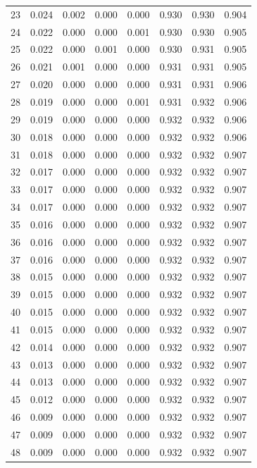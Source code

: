 \documentclass{article}%
\begin{document}
\begin{table}[H]
\begin{tabular}{cccccccc}
23 & 0.024 & 0.002 & 0.000 & 0.000 & 0.930 & 0.930 & 0.904 \\
24 & 0.022 & 0.000 & 0.000 & 0.001 & 0.930 & 0.930 & 0.905 \\
25 & 0.022 & 0.000 & 0.001 & 0.000 & 0.930 & 0.931 & 0.905 \\
26 & 0.021 & 0.001 & 0.000 & 0.000 & 0.931 & 0.931 & 0.905 \\
27 & 0.020 & 0.000 & 0.000 & 0.000 & 0.931 & 0.931 & 0.906 \\
28 & 0.019 & 0.000 & 0.000 & 0.001 & 0.931 & 0.932 & 0.906 \\
29 & 0.019 & 0.000 & 0.000 & 0.000 & 0.932 & 0.932 & 0.906 \\
30 & 0.018 & 0.000 & 0.000 & 0.000 & 0.932 & 0.932 & 0.906 \\
31 & 0.018 & 0.000 & 0.000 & 0.000 & 0.932 & 0.932 & 0.907 \\
32 & 0.017 & 0.000 & 0.000 & 0.000 & 0.932 & 0.932 & 0.907 \\
33 & 0.017 & 0.000 & 0.000 & 0.000 & 0.932 & 0.932 & 0.907 \\
34 & 0.017 & 0.000 & 0.000 & 0.000 & 0.932 & 0.932 & 0.907 \\
35 & 0.016 & 0.000 & 0.000 & 0.000 & 0.932 & 0.932 & 0.907 \\
36 & 0.016 & 0.000 & 0.000 & 0.000 & 0.932 & 0.932 & 0.907 \\
37 & 0.016 & 0.000 & 0.000 & 0.000 & 0.932 & 0.932 & 0.907 \\
38 & 0.015 & 0.000 & 0.000 & 0.000 & 0.932 & 0.932 & 0.907 \\
39 & 0.015 & 0.000 & 0.000 & 0.000 & 0.932 & 0.932 & 0.907 \\
40 & 0.015 & 0.000 & 0.000 & 0.000 & 0.932 & 0.932 & 0.907 \\
41 & 0.015 & 0.000 & 0.000 & 0.000 & 0.932 & 0.932 & 0.907 \\
42 & 0.014 & 0.000 & 0.000 & 0.000 & 0.932 & 0.932 & 0.907 \\
43 & 0.013 & 0.000 & 0.000 & 0.000 & 0.932 & 0.932 & 0.907 \\
44 & 0.013 & 0.000 & 0.000 & 0.000 & 0.932 & 0.932 & 0.907 \\
45 & 0.012 & 0.000 & 0.000 & 0.000 & 0.932 & 0.932 & 0.907 \\
46 & 0.009 & 0.000 & 0.000 & 0.000 & 0.932 & 0.932 & 0.907 \\
47 & 0.009 & 0.000 & 0.000 & 0.000 & 0.932 & 0.932 & 0.907 \\
48 & 0.009 & 0.000 & 0.000 & 0.000 & 0.932 & 0.932 & 0.907 \\
\bottomrule
\end{tabular}
%
\end{table}
\end{document}
